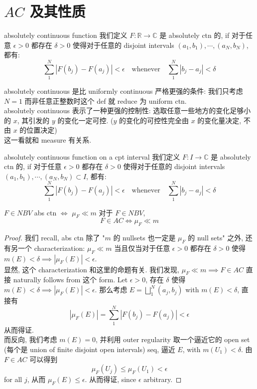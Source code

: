 \documentclass[lang=cn,11pt]{elegantbook}
\begin{document}
\section{$AC$ 及其性质}
\begin{definition}{absolutely continuous function}
我们定义 $F: \mathbb{R}\to \mathbb{C}$ 是 absolutely ctn 的, if 对于任意 $\epsilon > 0$ 都存在 $\delta > 0$ 使得对于任意的 disjoint intervals $(a_1,b_1),\cdots, (a_N,b_N)$, 都有: \[
\sum_1^N |F(b_j) - F(a_j)| <\epsilon \quad  \text{whenever}\quad \sum_1^N |b_j - a_j| <\delta
\]
\end{definition}
\begin{remark}
    absolutely continuous 是比 uniformly continuous 严格更强的条件: 我们只考虑 $N=1$ 而非任意正整数时这个 def 就 reduce 为 uniform ctn.\\
     absolutely continuous  表示了一种更强的控制性: 选取任意一些地方的变化足够小的 $x$, 其引发的 $y$ 的变化一定可控. ($y$ 的变化的可控性完全由 $x$ 的变化量决定, 不由 $x$ 的位置决定)\\
     这一看就和 measure 有关系.
\end{remark}
\begin{definition}{absolutely continuous function on a cpt interval}
我们定义 $F:I \to \mathbb{C}$ 是 absolutely ctn 的, if 对于任意 $\epsilon > 0$ 都存在 $\delta > 0$ 使得对于任意的 disjoint intervals $(a_1,b_1),\cdots, (a_N,b_N) \subset I$, 都有: \[
\sum_1^N |F(b_j) - F(a_j)| <\epsilon \quad  \text{whenever}\quad \sum_1^N |b_j - a_j| <\delta
\]
\end{definition}

\begin{lemma}{$F\in NBV$ abs ctn $\iff$ $\mu_F \ll m$}
    对于 $F\in NBV$, $$F \in AC\iff \mu_F \ll m$$
\end{lemma}
\begin{proof}
    我们 recall, abs ctn 除了 "$m$ 的 nullsets 也一定是 $\mu_F$ 的 null sets" 之外, 还有另一个 characterization: $\mu_F \ll m$ 当且仅当对于任意 $\epsilon > 0$ 都存在 $\delta > 0$ 使得 $ m(E) < \delta \implies|\mu_F(E)| < \epsilon$.\\
    显然, 这个 characterization 和这里的命题有关. 我们发现, $\mu_F  \ll m \implies F \in AC$ 直接 naturally follows from 这个 form. Let $\epsilon  >0$, 存在 $\delta$ 使得 $ m(E) < \delta \implies|\mu_F(E)| < \epsilon$. 那么考虑 $E = \bigsqcup_1^N (a_j,b_j)$ with $m(E) < \delta $, 直接有\[
    |\mu_F(E)|  = \sum_1^N |F(b_j) - F(a_j)| < \epsilon
    \]
从而得证.\\
而反向, 我们考虑 $m(E) = 0$, 并利用 outer regularity 取一个逼近它的 open set (每个是 union of finite disjoint open intervals) seq, 逼近 $E$, with $m(U_1) < \delta$. 由 $F \in AC$ 可以得到 \[
\mu_F(U_j) \leq \mu_F(U_1) < \epsilon
\] for all $j$, 从而 $\mu_F(E) \le \epsilon$. 从而得证, since $\epsilon $ arbitrary.
\end{proof}
\end{document}
